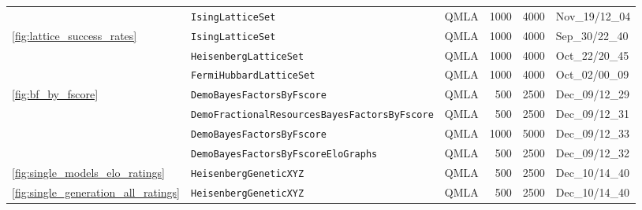 \begin{tabular}{lllrrl}
                          & \texttt{IsingLatticeSet} &                                     QMLA &                                     1000 &                                     4000 &                           Nov\_19/12\_04 \\
\cline{1-6}
\multirow{3}{*}{\cref{fig:lattice_success_rates}} & \texttt{IsingLatticeSet} &                                     QMLA &                                     1000 &                                     4000 &                           Sep\_30/22\_40 \\
                          & \texttt{HeisenbergLatticeSet} &                                     QMLA &                                     1000 &                                     4000 &                           Oct\_22/20\_45 \\
                          & \texttt{FermiHubbardLatticeSet} &                                     QMLA &                                     1000 &                                     4000 &                           Oct\_02/00\_09 \\
\cline{1-6}
\multirow{4}{*}{\cref{fig:bf_by_fscore}} & \texttt{DemoBayesFactorsByFscore} &                                     QMLA &                                      500 &                                     2500 &                           Dec\_09/12\_29 \\
                          & \texttt{DemoFractionalResourcesBayesFactorsByFscore} &                                     QMLA &                                      500 &                                     2500 &                           Dec\_09/12\_31 \\
                          & \texttt{DemoBayesFactorsByFscore} &                                     QMLA &                                     1000 &                                     5000 &                           Dec\_09/12\_33 \\
                          & \texttt{DemoBayesFactorsByFscoreEloGraphs} &                                     QMLA &                                      500 &                                     2500 &                           Dec\_09/12\_32 \\
\cline{1-6}
\cref{fig:single_models_elo_ratings} & \texttt{HeisenbergGeneticXYZ} &                                     QMLA &                                      500 &                                     2500 &                           Dec\_10/14\_40 \\
\multirow{2}{*}{\cref{fig:single_generation_all_ratings}} & \texttt{HeisenbergGeneticXYZ} &                                     QMLA &                                      500 &                                     2500 &                           Dec\_10/14\_40 \\

\end{tabular}
